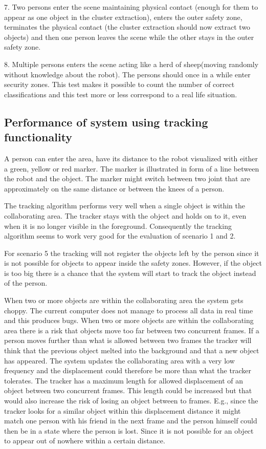 7. Two persons enter the scene maintaining physical contact (enough for them to appear as one object in the cluster extraction), enters the outer safety zone, terminates the physical contact (the cluster extraction should now extract two objects) and then one person leaves the scene while the other stays in the outer safety zone.

8. Multiple persons enters the scene acting like a herd of sheep(moving randomly without knowledge about the robot). The persons should once in a while enter security zones. This test makes it possible to count the number of correct classifications and this test more or less correspond to a real life situation. 

\subsection{Performance of system using tracking functionality}
A person can enter the area, have its distance to the robot visualized with either a green, yellow or red marker.
The marker is illustrated in form of a line between the robot and the object.
The marker might switch between two joint that are approximately on the same distance or between the knees of a person. 

The tracking algorithm performs very well when a single object is within the collaborating area.
The tracker stays with the object and holds on to it, even when it is no longer visible in the foreground. 
Consequently the tracking algorithm seems to work very good for the evaluation of scenario 1 and 2.

For scenario 5 the tracking will not register the objects left by the person since it is not possible for objects to appear inside the safety zones. However, if the object is too big there is a chance that the system will start to track the object instead of the person. 

When two or more objects are within the collaborating area the system gets choppy.
The current computer does not manage to process all data in real time and this produces bugs.
When two or more objects are within the collaborating area there is a risk that objects move too far between two concurrent frames.
If a person moves further than what is allowed between two frames the tracker will think that the previous object melted into the background and that a new object has appeared.
The system updates the collaborating area with a very low frequency and the displacement could therefore be more than what the tracker tolerates.
The tracker has a maximum length for allowed displacement of an object between two concurrent frames.
This length could be increased but that would also increase the risk of losing an object between to frames.
E.g., since the tracker looks for a similar object within this displacement distance it might match one person with his friend in the next frame and the person himself could then be in a state where the person is lost. 
Since it is not possible for an object to appear out of nowhere within a certain distance.\\


